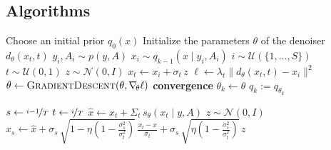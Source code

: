 \begin{subappendices}

\clearpage
\section{Algorithms} \label{app:diem-algorithms}

\begin{algorithm}
    \caption{Expectation-maximization pipeline} \label{alg:em}
    \begin{algorithmic}[1]
        \State Choose an initial prior $q_0(x)$
        \State Initialize the parameters $\theta$ of the denoiser $d_\theta(x_t, t)$
                \State $y_i, A_i \sim p(y, A)$
                \State $x_i \sim q_{k-1}(x \mid y_i, A_i)$ 
            \EndFor
            \Repeat
                \State $i \sim \mathcal{U}(\{1, \dots, S\})$
                \State $t \sim \mathcal{U}(0, 1)$
                \State $z \sim \mathcal{N}(0, I)$
                \State $x_t \gets x_i + \sigma_t \, z$
                \State $\ell \gets \lambda_t \big\| d_\theta(x_t, t) - x_i \big\|^2$ 
                \State $\theta \gets \Call{GradientDescent}{\theta, \grad{\theta} \ell}$
            \Until \textbf{convergence}
            \State $\theta_k \gets \theta$
            \State $q_k := q_{\theta_k}$
        \EndFor
        \State {}
	\end{algorithmic}
\end{algorithm}

\begin{algorithm}
    \caption{DDIM-style posterior sampling} \label{alg:ddim-sampling}
    \begin{algorithmic}[1]
            \State $s \gets \nicefrac{i - 1}{T}$
            \State $t \gets \nicefrac{i}{T}$
            \State $\hat{x} \gets x_t + \Sigma_t \, s_{\theta}(x_t \mid y, A)$ 
            \State $z \sim \mathcal{N}(0, I)$
            \State $\displaystyle x_s \gets \hat{x} + \sigma_s \, \sqrt{1 - \eta \left( 1 - \frac{\sigma_s^2}{\sigma_t^2} \right)} \, \frac{x_t - \hat{x}}{\sigma_t} + \sigma_s \, \sqrt{\eta \left( 1 - \frac{\sigma_s^2}{\sigma_t^2} \right)} \, z$
        \EndFor
        \State {}
	\end{algorithmic}
\end{algorithm}


\end{subappendices}
